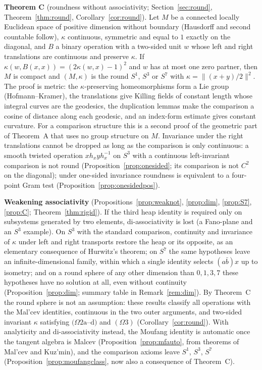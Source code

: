 \documentclass[11pt,reqno]{amsart}
\theoremstyle{definition}
\theoremstyle{remark}
\numberwithin{equation}{section}
\begin{document}
\noindent\textbf{Theorem C} (roundness without associativity; Section~\ref{sec:round}, Theorem~\ref{thm:round}, Corollary~\ref{cor:round}).  Let $M$ be a connected
locally Euclidean space of positive dimension without boundary (Hausdorff and second countable follow), $\kappa$ continuous, symmetric and equal to $1$ exactly on the diagonal, and $B$ a binary operation with a
two-sided unit $w$ whose left and right translations are continuous and preserve $\kappa$.  If $\kappa(w,B(x,x))=(2\kappa(w,x)-1)^2$ and $w$
has at most one zero partner, then $M$ is compact and $(M,\kappa)$ is the round $S^1$, $S^3$ or $S^7$ with $\kappa=\lVert(x+y)/2\rVert^2$.  The
proof is metric: the $\kappa$-preserving homeomorphisms form a Lie group (Hofmann--Kramer), the translations give Killing fields of
constant length whose integral curves are the geodesics, the duplication lemmas make the comparison a cosine of distance along each
geodesic, and an index-form estimate gives constant curvature.  For a comparison structure this is a second proof of the geometric
part of Theorem~A that uses no group structure on $M$.  Invariance under the right translations cannot be dropped as long as the
comparison is only continuous: a smooth twisted operation $xh_xyh_x^{-1}$ on $S^3$ with a continuous left-invariant comparison is not round
(Proposition~\ref{prop:onesided}; its comparison is not $C^2$ on the diagonal); under one-sided invariance roundness is equivalent to a
four-point Gram test (Proposition~\ref{prop:onesidedpos}).

\noindent\textbf{Weakening associativity} (Propositions~\ref{prop:weaknot}, \ref{prop:dim}, \ref{prop:S7}, \ref{prop:C}; Theorem~\ref{thm:rigid}).  If the
third heap identity is required only on subsystems generated by two elements, di-associativity is lost (a Fano-plane and
an $S^3$ example).  On $S^3$ with the standard comparison, continuity and invariance of $\kappa$ under left and right transports
restore the heap or its opposite, as an elementary consequence of Hurwitz's theorem; on $S^7$ the same hypotheses leave an
infinite-dimensional family, within which a single identity selects $(a\bar b)x$ up to isometry; and on a round sphere of any other
dimension than $0,1,3,7$ these hypotheses have no solution at all, even without continuity (Proposition~\ref{prop:dim}; summary table in Remark~\ref{rem:dim}).
By Theorem~C the round sphere is not an assumption: these results classify all operations with the Mal'cev identities,
continuous in the two outer arguments, and two-sided invariant $\kappa$ satisfying $(\Omega2\mathrm a$--$\mathrm d)$ and $(\Omega3)$ (Corollary~\ref{cor:round}).  With analyticity and
di-associativity instead, the Moufang identity is automatic once the tangent algebra is Malcev (Proposition~\ref{prop:mfauto}, from
theorems of Mal'cev and Kuz'min), and the comparison axioms leave $S^1$, $S^3$, $S^7$ (Proposition~\ref{prop:moufangclass}, now also a
consequence of Theorem~C).
\end{document}
